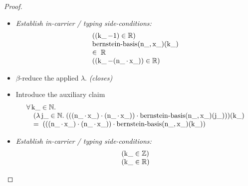 \documentclass[11pt]{article}
\theoremstyle{plain}
\begin{document}
\begin{proof}
\begin{itemize}[leftmargin=2.8em, itemsep=4pt, parsep=1pt]
  \item[\textbf{105--107}] \emph{Establish in-carrier / typing side-conditions:}
\begin{equation*}
\begin{array}{@{}l@{}}
((\operatorname{k\_} - 1) \in \mathbb{R}) \\
\begin{array}{@{}l@{}} \operatorname{bernstein\text{-}basis}(\operatorname{n\_}, \operatorname{x\_})(\operatorname{k\_}) \\ \in\; \mathbb{R} \end{array} \\
((\operatorname{k\_} - (\operatorname{n\_} \cdot \operatorname{x\_})) \in \mathbb{R})
\end{array}
\end{equation*}

  \item[\textbf{108--109}] $\beta$-reduce the applied $\lambda$.  \emph{(closes)}
  \item[\textbf{110}] Introduce the auxiliary claim
\begin{equation*}
\begin{array}{@{}l@{}} \forall \operatorname{k\_} \in \mathbb{N}. \\ \quad (\lambda \operatorname{j\_} \in \mathbb{N}.\; (((\operatorname{n\_} \cdot \operatorname{x\_}) \cdot (\operatorname{n\_} \cdot \operatorname{x\_})) \cdot \operatorname{bernstein\text{-}basis}(\operatorname{n\_}, \operatorname{x\_})(\operatorname{j\_})))(\operatorname{k\_}) \\ \quad =\; (((\operatorname{n\_} \cdot \operatorname{x\_}) \cdot (\operatorname{n\_} \cdot \operatorname{x\_})) \cdot \operatorname{bernstein\text{-}basis}(\operatorname{n\_}, \operatorname{x\_})(\operatorname{k\_})) \end{array}
\end{equation*}

  \item[\textbf{111--113}] \emph{Establish in-carrier / typing side-conditions:}
\begin{equation*}
\begin{array}{@{}l@{}}
(\operatorname{k\_} \in \mathbb{Z}) \\
(\operatorname{k\_} \in \mathbb{R})
\end{array}
\end{equation*}


\end{itemize}
\end{proof}
\end{document}
